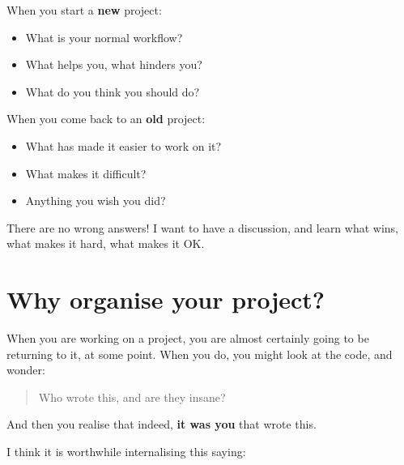 \documentclass[
  letterpaper,
  justified,
  a4paper]{tufte-book}
\providecommand{\tightlist}{%
  \setlength{\itemsep}{0pt}\setlength{\parskip}{0pt}}
\providecommand{\tightlist}{%
  \setlength{\itemsep}{0pt}\setlength{\parskip}{0pt}}
\begin{document}
\begin{tcolorbox}[enhanced jigsaw, arc=.35mm, bottomrule=.15mm, bottomtitle=1mm, breakable, colback=white, colbacktitle=quarto-callout-note-color!10!white, colframe=quarto-callout-note-color-frame, coltitle=black, left=2mm, leftrule=.75mm, opacityback=0, opacitybacktitle=0.6, rightrule=.15mm, title=\textcolor{quarto-callout-note-color}{\faInfo}\hspace{0.5em}{Your Turn}, titlerule=0mm, toprule=.15mm, toptitle=1mm]

When you start a \textbf{new} project:

\begin{itemize}
\tightlist
\item
  What is your normal workflow?
\item
  What helps you, what hinders you?
\item
  What do you think you should do?
\end{itemize}

When you come back to an \textbf{old} project:

\begin{itemize}
\tightlist
\item
  What has made it easier to work on it?
\item
  What makes it difficult?
\item
  Anything you wish you did?
\end{itemize}

There are no wrong answers! I want to have a discussion, and learn what
wins, what makes it hard, what makes it OK.

\end{tcolorbox}

\section{Why organise your project?}\label{why-organise-your-project}

When you are working on a project, you are almost certainly going to be
returning to it, at some point. When you do, you might look at the code,
and wonder:

\begin{quote}
Who wrote this, and are they insane?
\end{quote}

And then you realise that indeed, \textbf{it was you} that wrote this.

I think it is worthwhile internalising this saying:
\end{document}
